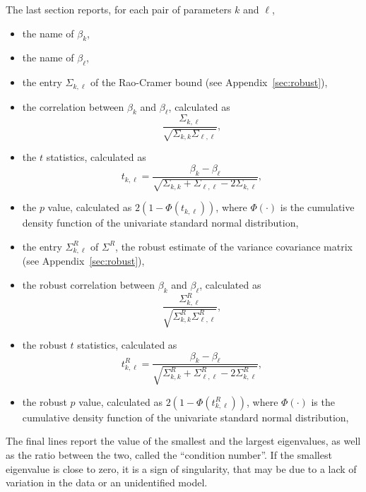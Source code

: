 \documentclass[12pt,a4paper]{article}
\begin{document}
The last section reports, for each pair of parameters $k$ and
$\ell$,
\begin{itemize}
\item the name of $\beta_k$,
\item the name of $\beta_\ell$,
\item the entry $\Sigma_{k,\ell}$ of the 
         Rao-Cramer bound (see Appendix~\ref{sec:robust}),
\item the correlation between $\beta_k$ and $\beta_\ell$, calculated as
\begin{equation}
\frac{\Sigma_{k,\ell}}{\sqrt{\Sigma_{k,k}\Sigma_{\ell,\ell}}},
\end{equation}
\item the $t$ statistics, calculated as
\begin{equation}
t_{k,\ell}= \frac{\beta_k - \beta_\ell}{\sqrt{\Sigma_{k,k} + \Sigma_{\ell,\ell} - 2 \Sigma_{k,\ell}}},
\end{equation}
  \item the $p$ value, calculated as $2 (1 - \Phi(t_{k,\ell}))$,
where $\Phi(\cdot)$ is the cumulative density function of the
univariate standard normal distribution,
\item the entry $\Sigma^R_{k,\ell}$ of $\Sigma^R$, the robust estimate of the variance covariance matrix (see Appendix~\ref{sec:robust}),
\item the robust correlation between $\beta_k$ and $\beta_\ell$, calculated as
\begin{equation}
\frac{\Sigma^R_{k,\ell}}{\sqrt{\Sigma^R_{k,k}\Sigma^R_{\ell,\ell}}},
\end{equation}
\item the robust $t$ statistics, calculated as
\begin{equation}
t^R_{k,\ell}=\frac{\beta_k - \beta_\ell}{\sqrt{\Sigma^R_{k,k} + \Sigma^R_{\ell,\ell}
    - 2 \Sigma^R_{k,\ell}}},
\end{equation}
     \item the robust $p$ value, calculated as $2 (1 - \Phi(t^R_{k,\ell}))$,
where $\Phi(\cdot)$ is the cumulative density function of the
univariate standard normal distribution,
\end{itemize}
The final lines report the value of the smallest and the largest
eigenvalues, as well as the ratio between the two, called the
``condition number''.   If the smallest eigenvalue is close to zero, it is a sign of
singularity, that may be due to a lack of variation in the data or
an unidentified model.
\end{document}

